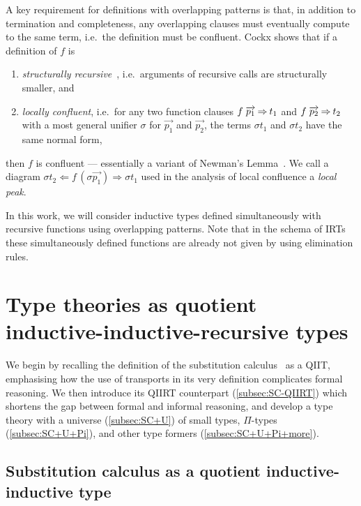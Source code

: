 \documentclass[a4paper,UKenglish,numberwithinsect,cleveref,thm-restate]{lipics-v2021}
\begin{document}
A key requirement for definitions with overlapping patterns is that, in addition to termination and completeness, any overlapping clauses must eventually compute to the same term, i.e.\ the definition must be confluent.
Cockx shows that if a definition of $f$ is
\begin{enumerate}
  \item \emph{structurally recursive}~\cite{Abel2002}, i.e.\ arguments of recursive calls are structurally smaller, and
  \item \emph{locally confluent}, i.e.\ for any two function clauses $f\;\overrightarrow{p_1} \mathbin{\Rightarrow} t_1$ and $f\;\overrightarrow{p_2} \mathbin{\Rightarrow} t_2$ with a most general unifier $\sigma$ for $\overrightarrow{p_1}$ and $\overrightarrow{p_2}$, the terms $\sigma t_1$ and $\sigma t_2$ have the same normal form, 
\end{enumerate}
then $f$ is confluent --- essentially a variant of Newman's Lemma~\cite{Newman1942}.
We call a diagram $\sigma t_2 \Leftarrow f\,(\sigma\overrightarrow{p_1}) \Rightarrow \sigma t_1$ used in the analysis of local confluence a \emph{local peak}.

In this work, we will consider inductive types defined simultaneously with recursive functions using overlapping patterns.
Note that in the schema of IRTs these simultaneously defined functions are already not given by using elimination rules.

\section{Type theories as quotient inductive-inductive-recursive types} \label{sec:QIIRTs}

We begin by recalling the definition of the substitution calculus~\cite{Martin-Lof1992} as a QIIT, emphasising how the use of transports in its very definition complicates formal reasoning.
We then introduce its QIIRT counterpart (\cref{subsec:SC-QIIRT}) which shortens the gap between formal and informal reasoning, and develop a type theory with a universe (\cref{subsec:SC+U}) of small types, $\Pi$-types (\cref{subsec:SC+U+Pi}), and other type formers (\cref{subsec:SC+U+Pi+more}).

\subsection{Substitution calculus as a quotient inductive-inductive type} \label{subsec:SC-QIIT}
\end{document}
